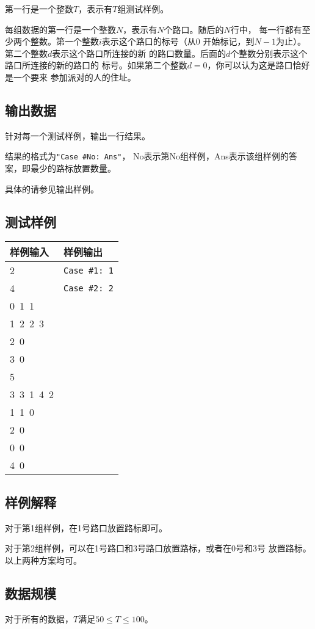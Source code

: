\documentclass{article}
\begin{document}
第一行是一个整数$T$，表示有$T$组测试样例。

每组数据的第一行是一个整数$N$，表示有$N$个路口。随后的$N$行中，
每一行都有至少两个整数。第一个整数$i$表示这个路口的标号（从0
开始标记，到$N - 1$为止）。第二个整数$d$表示这个路口所连接的新
的路口数量。后面的$d$个整数分别表示这个路口所连接的新的路口的
标号。如果第二个整数$d = 0$，你可以认为这是路口恰好是一个要来
参加派对的人的住址。

\subsection*{输出数据}
针对每一个测试样例，输出一行结果。

结果的格式为{\tt "Case \#No: Ans"}，
No表示第No组样例，Ans表示该组样例的答案，即最少的路标放置数量。

具体的请参见输出样例。

\subsection*{测试样例}
\begin{flushleft}
\begin{tabular}{|p{6cm}|p{6cm}|}
 \hline \bfseries{样例输入} & \bfseries{样例输出} \\
 \hline 
    2 & {\tt Case \#1: 1} \\
    4 & {\tt Case \#2: 2} \\
    0\ 1\ 1 & \\
    1\ 2\ 2\ 3 & \\
    2\ 0 & \\
    3\ 0 & \\
    5 & \\
    3\ 3\ 1\ 4\ 2 & \\
    1\ 1\ 0 & \\
    2\ 0 & \\
    0\ 0 & \\
    4\ 0 & \\
 \hline 
\end{tabular}
\end{flushleft}

\subsection*{样例解释}
对于第1组样例，在1号路口放置路标即可。

对于第2组样例，可以在1号路口和3号路口放置路标，或者在0号和3号
放置路标。以上两种方案均可。

\subsection*{数据规模}
对于所有的数据，$T$满足$50 \leq T \leq 100$。
\end{document}
